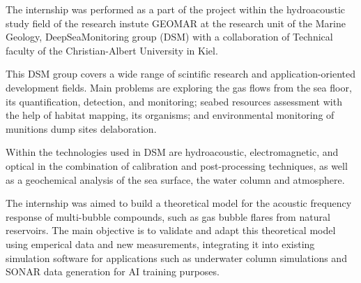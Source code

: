 

The internship was performed as a part of the project within the hydroacoustic study field of the research instute GEOMAR at the research unit of the Marine Geology, DeepSeaMonitoring group (DSM) with a collaboration of Technical faculty of the Christian-Albert University in Kiel. 

This DSM group covers a wide range of scintific research and application-oriented development fields. Main problems are exploring the gas flows from the sea floor, its quantification, detection, and monitoring; seabed resources assessment with the help of habitat mapping, its organisms; and environmental monitoring of munitions dump sites delaboration\cite{noauthor_deepsea_nodate}.

Within the technologies used in DSM are hydroacoustic, electromagnetic, and optical in the combination of calibration and post-processing techniques, as well as a geochemical analysis of the sea surface, the water column and atmosphere.

The internship was aimed to build a theoretical model for the acoustic frequency response of multi-bubble compounds, such as gas bubble flares from natural reservoirs. The main objective is to validate and adapt this theoretical model using emperical data and new measurements, integrating it into existing simulation software for applications such as underwater column simulations and SONAR data generation for AI training purposes.

